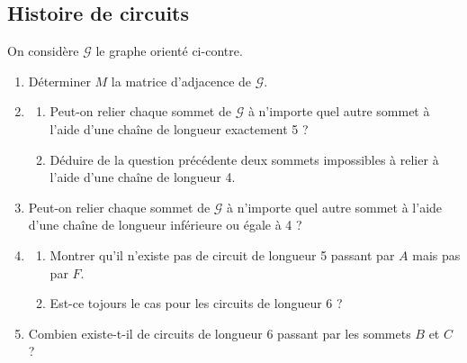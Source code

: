 \documentclass[oneside,12pt]{article}          %
\begin{document}
\subsection{Histoire de circuits}
\begin{minipage}{0.68\linewidth}
On considère $\mathcal{G}$ le graphe orienté ci-contre.
\begin{enumerate}
    \item Déterminer $M$ la matrice d'adjacence de $\mathcal{G}$.
    \item  \begin{enumerate}
        \item Peut-on relier chaque sommet de $\mathcal{G}$ à n'importe quel autre sommet à l'aide d'une chaîne de longueur exactement 5 ?
        \item Déduire de la question précédente deux sommets impossibles à relier à l'aide d'une chaîne de longueur 4.
    \end{enumerate}
    \item Peut-on relier chaque sommet de $\mathcal{G}$ à n'importe quel autre sommet à l'aide d'une chaîne de longueur inférieure ou égale à 4 ?
    \item \begin{enumerate}
        \item Montrer qu'il n'existe pas de circuit de longueur 5 passant par $A$  mais pas par $F$.
        \item Est-ce tojours le cas pour les circuits de longueur 6 ?
    \end{enumerate}
    \item Combien existe-t-il de circuits de longueur 6 passant par les sommets $B$ et $C$ ?
\end{enumerate}
\end{minipage}\hspace{5mm}
\begin{minipage}{0.35\linewidth}
\end{minipage}
\end{document}

